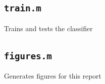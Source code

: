 \documentclass[titlepage,12pt,letter]{article}
\begin{document}
\subsection{\texttt{train.m}}
\label{scr:train}
Trains and tests the classifier


\subsection{\texttt{figures.m}}
\label{scr:figures}
Generates figures for this report


\newpage


\end{document}
